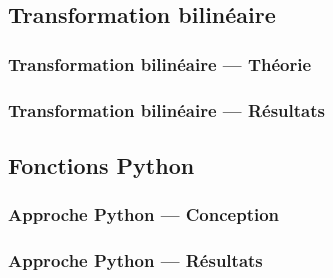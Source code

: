 \subsection{Transformation bilinéaire}

\begin{frame}
\frametitle{Transformation bilinéaire — Théorie}
\todo{}
\end{frame}

\begin{frame}
\frametitle{Transformation bilinéaire — Résultats}
\todo{}
\end{frame}

\subsection{Fonctions Python}

\begin{frame}
\frametitle{Approche Python — Conception}
\todo{}
\end{frame}

\begin{frame}
\frametitle{Approche Python — Résultats}
\todo{}
\end{frame}
